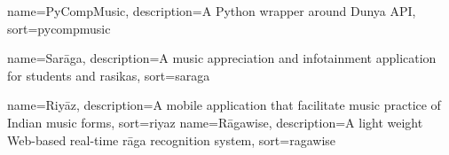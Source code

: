 {
	name={PyCompMusic},
	description={A Python wrapper around Dunya API},
	sort=pycompmusic
}

{
	name={Sar\={a}ga},
	description={A music appreciation and infotainment application for students and rasikas},
	sort=saraga
}

{
	name={Riy\={a}z},
	description={A mobile application that facilitate music practice of Indian music forms},
	sort=riyaz
}
{
	name={R\={a}gawise},
	description={A light weight Web-based real-time r\={a}ga recognition system},
	sort=ragawise
}		






